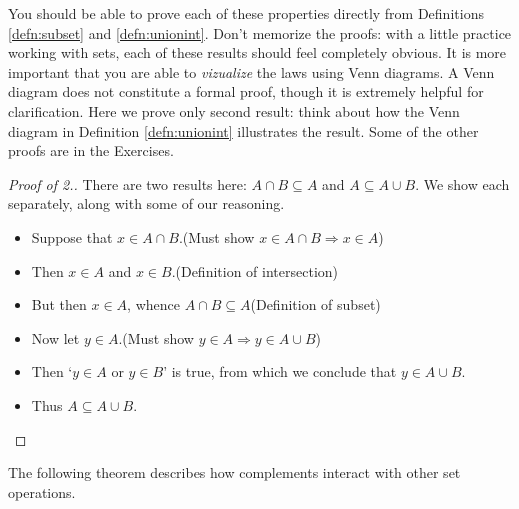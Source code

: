 \noindent You should be able to prove each of these properties directly from Definitions \ref{defn:subset} and \ref{defn:unionint}. Don't memorize the proofs: with a little practice working with sets, each of these results should feel completely obvious. It is more important that you are able to \emph{vizualize} the laws using Venn diagrams. A Venn diagram does not constitute a formal proof, though it is extremely helpful for clarification. Here we prove only second result: think about how the Venn diagram in Definition \ref{defn:unionint} illustrates the result. Some of the other proofs are in the Exercises.

\begin{proof}[Proof of 2.]
There are two results here: $A\cap B\subseteq A$ and $A\subseteq A\cup B$. We show each separately, along with some of our reasoning.
\begin{itemize}\setlength{\itemsep}{-2pt}
  \item[]Suppose that $x\in A\cap B$.\hfill(Must show $x\in A\cap B\Rightarrow x\in A$)
  \item[]Then $x\in A$ and $x\in B$.\hfill(Definition of intersection)
  \item[]But then $x\in A$, whence $A\cap B\subseteq A$\hfill(Definition of subset)
  \item[]Now let $y\in A$.\hfill(Must show $y\in A\Rightarrow y\in A\cup B$)
  \item[]Then `$y\in A$ or $y\in B$' is true, from which we conclude that $y\in A\cup B$.
  \item[]Thus $A\subseteq A\cup B$.\qedhere
\end{itemize}
\end{proof}

The following theorem describes how complements interact with other set operations.\\


